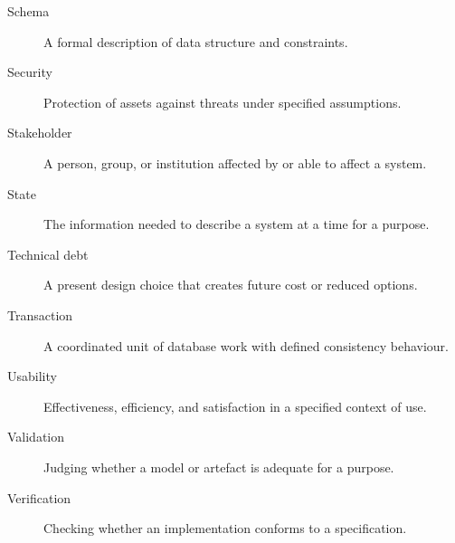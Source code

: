 \begin{description}
\item[Schema] A formal description of data structure and constraints.
\item[Security] Protection of assets against threats under specified assumptions.
\item[Stakeholder] A person, group, or institution affected by or able to affect a system.
\item[State] The information needed to describe a system at a time for a purpose.
\item[Technical debt] A present design choice that creates future cost or reduced options.
\item[Transaction] A coordinated unit of database work with defined consistency behaviour.
\item[Usability] Effectiveness, efficiency, and satisfaction in a specified context of use.
\item[Validation] Judging whether a model or artefact is adequate for a purpose.
\item[Verification] Checking whether an implementation conforms to a specification.
\end{description}

